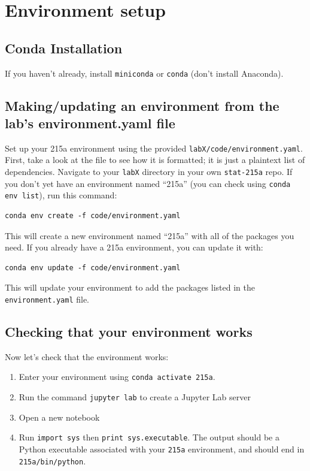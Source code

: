 \documentclass[letterpaper,12pt]{article}
\begin{document}
\section{Environment setup}

\subsection{Conda Installation}
If you haven't already, install \texttt{miniconda} or \texttt{conda} (don't install Anaconda).

\subsection{Making/updating an environment from the lab's environment.yaml file}
Set up your 215a environment using the provided \texttt{labX/code/environment.yaml}. First, take a look at the file to see how it is formatted; it is just a plaintext list of dependencies. Navigate to your \texttt{labX} directory in your own \texttt{stat-215a} repo. If you don't yet have an environment named ``215a'' (you can check using \texttt{conda env list}), run this command:
\begin{verbatim}
conda env create -f code/environment.yaml
\end{verbatim}
This will create a new environment named ``215a'' with all of the packages you need. If you already have a 215a environment, you can update it with:
\begin{verbatim}
conda env update -f code/environment.yaml
\end{verbatim}
This will update your environment to add the packages listed in the \texttt{environment.yaml} file.

\subsection{Checking that your environment works}
Now let's check that the environment works:
\begin{enumerate}
    \item Enter your environment using \texttt{conda activate 215a}.
    \item Run the command \texttt{jupyter lab} to create a Jupyter Lab server
    \item Open a new notebook
    \item Run \texttt{import sys} then \texttt{print sys.executable}. The output should be a Python executable associated with your \texttt{215a} environment, and should end in \texttt{215a/bin/python}.
\end{enumerate}
\end{document}
